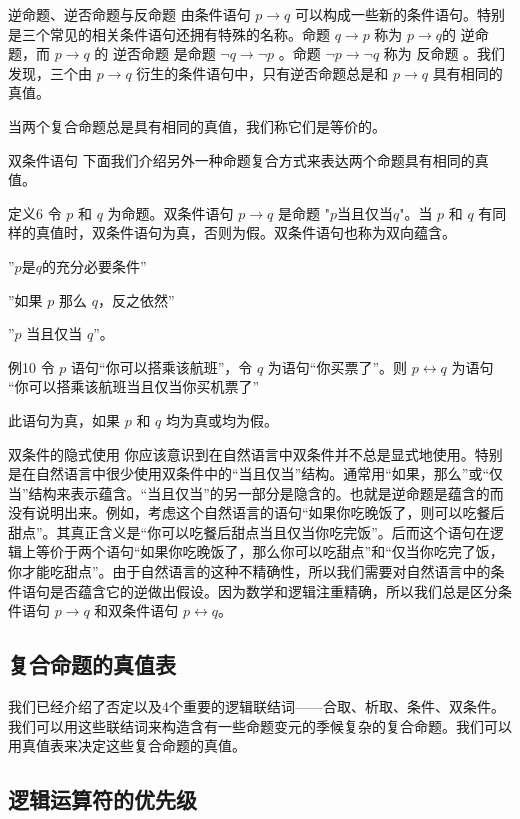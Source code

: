 逆命题、逆否命题与反命题 由条件语句 $p \to q$ 可以构成一些新的条件语句。特别是三个常见的相关条件语句还拥有特殊的名称。命题 $q \to p$ 称为 $p \to q$的 逆命题，而 $p \to q$ 的 逆否命题 是命题 $\neg q \to \neg p$ 。命题 $\neg p \to \neg q$ 称为 反命题 。我们发现，三个由 $p \to q$ 衍生的条件语句中，只有逆否命题总是和 $p \to q$ 具有相同的真值。  

当两个复合命题总是具有相同的真值，我们称它们是等价的。  

双条件语句  下面我们介绍另外一种命题复合方式来表达两个命题具有相同的真值。  

定义6  令 $p$ 和 $q$ 为命题。双条件语句 $p \to q$ 是命题 "$p\mbox{当且仅当}q$"。当 $p$ 和 $q$ 有同样的真值时，双条件语句为真，否则为假。双条件语句也称为双向蕴含。

''$p\mbox{是}q$的充分必要条件''

''如果 $p$ 那么 $q$，反之依然''

''$p$ 当且仅当 $q$''。


例10  令 $p$ 语句“你可以搭乘该航班”，令 $q$ 为语句“你买票了”。则 $p \leftrightarrow q$ 为语句
“你可以搭乘该航班当且仅当你买机票了”

此语句为真，如果 $p$ 和 $q$ 均为真或均为假。  

双条件的隐式使用  你应该意识到在自然语言中双条件并不总是显式地使用。特别是在自然语言中很少使用双条件中的“当且仅当”结构。通常用“如果，那么”或“仅当”结构来表示蕴含。“当且仅当”的另一部分是隐含的。也就是逆命题是蕴含的而没有说明出来。例如，考虑这个自然语言的语句“如果你吃晚饭了，则可以吃餐后甜点”。其真正含义是“你可以吃餐后甜点当且仅当你吃完饭”。后而这个语句在逻辑上等价于两个语句“如果你吃晚饭了，那么你可以吃甜点”和“仅当你吃完了饭，你才能吃甜点”。由于自然语言的这种不精确性，所以我们需要对自然语言中的条件语句是否蕴含它的逆做出假设。因为数学和逻辑注重精确，所以我们总是区分条件语句 $p \to q$ 和双条件语句 $p \leftrightarrow q$。

\subsection{复合命题的真值表}

我们已经介绍了否定以及4个重要的逻辑联结词——合取、析取、条件、双条件。我们可以用这些联结词来构造含有一些命题变元的季候复杂的复合命题。我们可以用真值表来决定这些复合命题的真值。

\subsection{逻辑运算符的优先级}

